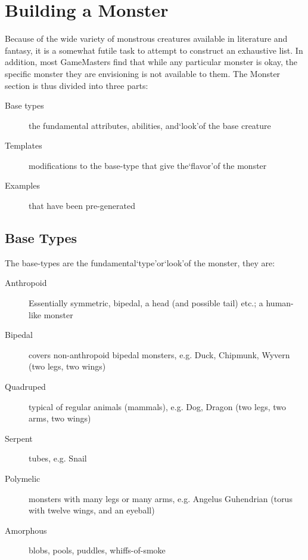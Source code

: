 \documentclass[twoside]{book}
\begin{document}
    

\section{Building a Monster}
    
    {  
    Because of the wide variety of monstrous creatures available in literature and fantasy, it is a somewhat futile task to attempt to construct an exhaustive list. In addition, most GameMasters find that while any particular monster is okay, the specific monster they are envisioning is not available to them. The Monster section is thus divided into three parts:
    }
  
\begin{description}
    
  \item[Base types] 
    {  
    the fundamental attributes, abilities, and`look'of the base creature
    }
  
  \item[Templates] 
    {  
    modifications to the base-type that give the`flavor'of the monster
    }
  
  \item[Examples] 
    {  
    that have been pre-generated
    }
  
\end{description}
  
    

\subsection{Base Types}
    
    {  
    The base-types are the fundamental`type'or`look'of the monster, they are:
    }
  
\begin{description}
    
  \item[Anthropoid] 
    {  
    Essentially symmetric, bipedal, a head (and possible tail) etc.; a human-like monster
    }
  
  \item[Bipedal] 
    {  
    covers non-anthropoid bipedal monsters, e.g. Duck, Chipmunk, Wyvern (two legs, two wings)
    }
  
  \item[Quadruped] 
    {  
    typical of regular animals (mammals), e.g. Dog, Dragon (two legs, two arms, two wings)
    }
  
  \item[Serpent] 
    {  
    tubes, e.g. Snail
    }
  
  \item[Polymelic] 
    {  
    monsters with many legs or many arms, e.g. Angelus Guhendrian (torus with twelve wings, and an eyeball)
    }
  
  \item[Amorphous] 
    {  
    blobs, pools, puddles, whiffs-of-smoke
    }
  
\end{description}
  
\end{document}
